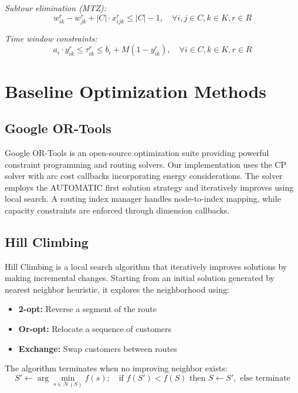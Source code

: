 \documentclass[11pt,a4paper]{article}
\begin{document}
\textit{Subtour elimination (MTZ):}
\begin{equation}
w_{ik}^r - w_{jk}^r + |C| \cdot x_{ijk}^r \leq |C| - 1, \quad \forall i,j \in C, k \in K, r \in R
\end{equation}

\textit{Time window constraints:}
\begin{equation}
a_i \cdot y_{ik}^r \leq \tau_{ik}^r \leq b_i + M(1 - y_{ik}^r), \quad \forall i \in C, k \in K, r \in R
\end{equation}

\section{Baseline Optimization Methods}

\subsection{Google OR-Tools}

Google OR-Tools is an open-source optimization suite providing powerful constraint programming and routing solvers. Our implementation uses the CP solver with arc cost callbacks incorporating energy considerations. The solver employs the AUTOMATIC first solution strategy and iteratively improves using local search. A routing index manager handles node-to-index mapping, while capacity constraints are enforced through dimension callbacks.

\subsection{Hill Climbing}

Hill Climbing is a local search algorithm that iteratively improves solutions by making incremental changes. Starting from an initial solution generated by nearest neighbor heuristic, it explores the neighborhood using:
\begin{itemize}
    \item \textbf{2-opt:} Reverse a segment of the route
    \item \textbf{Or-opt:} Relocate a sequence of customers
    \item \textbf{Exchange:} Swap customers between routes
\end{itemize}

The algorithm terminates when no improving neighbor exists:
\begin{equation}
S' \gets \arg\min_{s \in \mathcal{N}(S)} f(s); \quad \text{if } f(S') < f(S) \text{ then } S \gets S', \text{ else terminate}
\end{equation}
\end{document}
